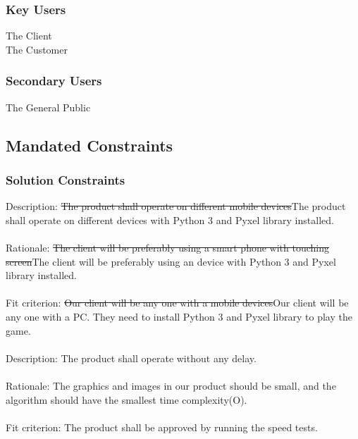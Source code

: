 \documentclass[12pt, titlepage]{article}
\begin{document}
\subsubsection*{Key Users}
The Client\\
The Customer\\
\subsubsection*{Secondary Users}
The General Public\\
\subsection{Mandated Constraints}
\subsubsection{Solution Constraints}
Description: \sout{The product shall operate on different mobile devices}{\color{red}The product shall operate on different devices with Python 3 and Pyxel library installed.} \\\\
Rationale: \sout{The client will be preferably using a smart phone with touching screen}{\color{red}The client will be preferably using an device with Python 3 and Pyxel library installed.}\\\\
Fit criterion: \sout{Our client will be any one with a mobile devices}{\color{red}Our client will be any one with a PC. They need to install Python 3 and Pyxel library to play the game.}\\\\
Description: The product shall operate without any delay.\\\\
Rationale: The graphics and images in our product should be small, and the algorithm should have the smallest time complexity(O).\\\\
Fit criterion: The product shall be approved by running the speed tests.\\\\

\end{document}
